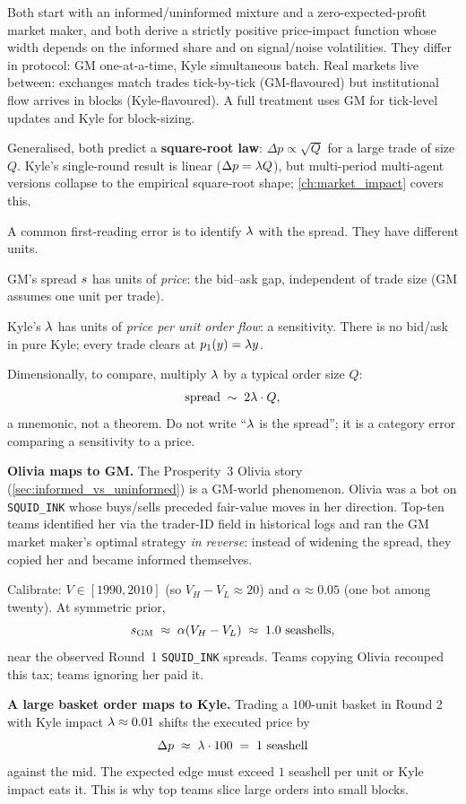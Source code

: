 Both start with an informed/uninformed mixture and a
zero-expected-profit market maker, and both derive a strictly
positive price-impact function whose width depends on the
informed share and on signal/noise volatilities. They differ in
protocol: GM one-at-a-time, Kyle simultaneous batch. Real markets
live between: exchanges match trades tick-by-tick (GM-flavoured)
but institutional flow arrives in blocks (Kyle-flavoured). A
full treatment uses GM for tick-level updates and Kyle for
block-sizing.

Generalised, both predict a \textbf{square-root law}: $\Delta p
\propto \sqrt{Q}$ for a large trade of size $Q$. Kyle's
single-round result is linear ($\Delta p = \lambda Q$), but
multi-period multi-agent versions collapse to the empirical
square-root shape; \cref{ch:market_impact} covers this.

\begin{pitfallbox}
A common first-reading error is to identify $\lambda$ with the
spread. They have different units.

GM's spread $s$ has units of \emph{price}: the bid--ask gap,
independent of trade size (GM assumes one unit per trade).

Kyle's $\lambda$ has units of \emph{price per unit order flow}: a
sensitivity. There is no bid/ask in pure Kyle; every trade
clears at $p_1(y) = \lambda y$.

Dimensionally, to compare, multiply $\lambda$ by a typical order
size $Q$:
\[
  \text{spread} \;\sim\; 2 \lambda \cdot Q,
\]
a mnemonic, not a theorem. Do not write ``$\lambda$ is the
spread''; it is a category error comparing a sensitivity to a
price.
\end{pitfallbox}

\begin{prosperitybox}
\textbf{Olivia maps to GM.} The Prosperity~3 Olivia story
(\cref{sec:informed_vs_uninformed}) is a GM-world phenomenon.
Olivia was a bot on \texttt{SQUID\_INK} whose buys/sells
preceded fair-value moves in her direction. Top-ten teams
identified her via the trader-ID field in historical logs and
ran the GM market maker's optimal strategy \emph{in reverse}:
instead of widening the spread, they copied her and became
informed themselves.

Calibrate: $V \in [1990, 2010]$ (so $V_H - V_L \approx 20$) and
$\alpha \approx 0.05$ (one bot among twenty). At symmetric prior,
\[
  s_{\mathrm{GM}} \;\approx\; \alpha (V_H - V_L)
  \;\approx\; 1.0 \text{ seashells},
\]
near the observed Round~1 \texttt{SQUID\_INK} spreads. Teams
copying Olivia recouped this tax; teams ignoring her paid it.

\textbf{A large basket order maps to Kyle.} Trading a $100$-unit
basket in Round 2 with Kyle impact $\lambda \approx 0.01$ shifts
the executed price by
\[
  \Delta p \;\approx\; \lambda \cdot 100 \;=\; 1 \text{ seashell}
\]
against the mid. The expected edge must exceed $1$ seashell per
unit or Kyle impact eats it. This is why top teams slice large
orders into small blocks.
\end{prosperitybox}

